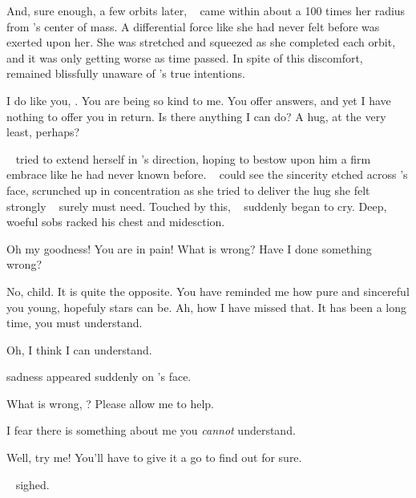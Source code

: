 \documentclass[main.tex]{subfiles}
\begin{document}
\newpara \nar And, sure enough, a few orbits later, \rmelectra~ came within about a 100 times her radius from \rmchiron's center of mass.  A differential force like she had never felt before was exerted upon her.  She was stretched and squeezed as she completed each orbit, and it was only getting worse as time passed.  In spite of this discomfort, \rmelectra~ remained blissfully unaware of \rmchiron's true intentions.

\newpara \Electra I do like you, \rmchiron.  You are being so kind to me.  You offer answers, and yet I have nothing to offer you in return.  Is there anything I can do?  A hug, at the very least, perhaps?

\newpara \nar \rmelectra~ tried to extend herself in \rmchiron's direction, hoping to bestow upon him a firm embrace like he had never known before.  \rmchiron~ could see the sincerity etched across \rmelectra's face, scrunched up in concentration as she tried to deliver the hug she felt strongly \rmchiron~ surely must need.  Touched by this, \rmchiron~ suddenly began to cry.  Deep, woeful sobs racked his chest and midesction.

\newpara \Electra Oh my goodness!  You are in pain!  What is wrong?  Have I done something wrong?

\newpara \Chiron No, child.  It is quite the opposite.  You have reminded me how pure and sincereful you young, hopefuly stars can be.  Ah, how I have missed that.  It has been a long time, you must understand.  

\newpara \Electra Oh, I think I can understand.

\newpara \nar sadness appeared suddenly on \rmchiron's face.

\newpara \Electra What is wrong, \rmchiron?  Please allow me to help.

\newpara \Chiron I fear there is something about me you \textit{cannot} understand.

\newpara \Electra Well, try me!  You'll have to give it a go to find out for sure.

\newpara \nar \rmchiron~ sighed.
\end{document}
